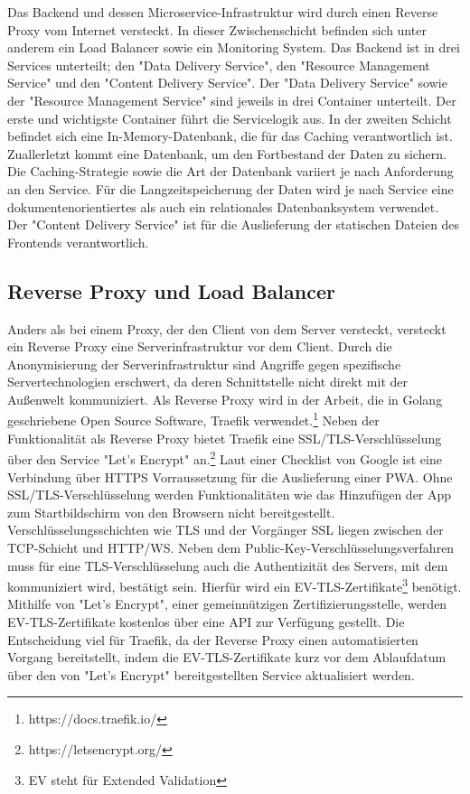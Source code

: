 Das Backend und dessen Microservice-Infrastruktur wird durch einen Reverse Proxy vom Internet versteckt.
In dieser Zwischenschicht befinden sich unter anderem ein Load Balancer sowie ein Monitoring System.
Das Backend ist in drei Services unterteilt; den "Data Delivery Service", den "Resource Management Service"
und den "Content Delivery Service". Der "Data Delivery Service" sowie der "Resource Management Service" sind jeweils
in drei Container unterteilt. Der erste und wichtigste Container führt die Servicelogik aus. In der zweiten
Schicht befindet sich eine In-Memory-Datenbank, die für das Caching verantwortlich ist. Zuallerletzt
kommt eine Datenbank, um den Fortbestand der Daten zu sichern. Die Caching-Strategie sowie die Art der
Datenbank variiert je nach Anforderung an den Service. Für die Langzeitspeicherung der Daten wird je nach Service
eine dokumentenorientiertes als auch ein relationales Datenbanksystem verwendet. Der "Content Delivery Service"
ist für die Auslieferung der statischen Dateien des Frontends verantwortlich.

\subsection{Reverse Proxy und Load Balancer}
\label{subsec:reverseproxyundloadbalancer}
Anders als bei einem Proxy, der den Client von dem Server versteckt, versteckt ein Reverse Proxy
eine Serverinfrastruktur vor dem Client. Durch die Anonymisierung der Serverinfrastruktur
sind Angriffe gegen spezifische Servertechnologien erschwert, da deren Schnittstelle
nicht direkt mit der Außenwelt kommuniziert. Als Reverse Proxy wird in der Arbeit,
die in Golang geschriebene Open Source Software, Traefik verwendet.\footnote{https://docs.traefik.io/}
Neben der Funktionalität als Reverse Proxy bietet Traefik eine
SSL/TLS-Verschlüsselung über den Service "Let's Encrypt" an.\footnote{https://letsencrypt.org/}
Laut einer Checklist von Google ist eine Verbindung über HTTPS
Vorraussetzung für die Auslieferung einer PWA.\cite{GooglePWAChecklist}
Ohne SSL/TLS-Verschlüsselung werden Funktionalitäten wie das Hinzufügen der App zum Startbildschirm
von den Browsern nicht bereitgestellt. Verschlüsselungsschichten wie TLS und der Vorgänger
SSL liegen zwischen der TCP-Schicht und HTTP/WS. Neben dem Public-Key-Verschlüsselungsverfahren
muss für eine TLS-Verschlüsselung auch die Authentizität des Servers, mit dem kommuniziert wird,
bestätigt sein. Hierfür wird ein EV-TLS-Zertifikate\footnote{EV steht für Extended Validation} benötigt.
Mithilfe von "Let's Encrypt", einer gemeinnützigen Zertifizierungsstelle, werden EV-TLS-Zertifikate
kostenlos über eine API zur Verfügung gestellt. Die Entscheidung viel für Traefik,
da der Reverse Proxy einen automatisierten Vorgang bereitstellt, indem die EV-TLS-Zertifikate
kurz vor dem Ablaufdatum über den von "Let's Encrypt" bereitgestellten Service aktualisiert werden.

